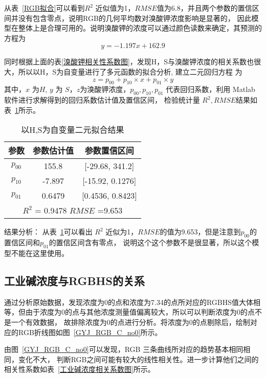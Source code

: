     从表~\ref{RGB拟合}可以看到$R^2$ 近似值为1，$RMSE$值为6.8，并且两个参数的置信区间并没有包含零点，说明RGB的几何平均数对溴酸钾浓度影响是显著的，
    因此模型在整体上是合理可用的。说明溴酸钾的浓度可以通过颜色读数来确定，其预测的方程为
    $$ y = -1.197 x + 162.9 $$

    同时根据上面的表\ref{溴酸钾相关性系数图}，发现H，S与溴酸钾浓度的相关系数也很大，所以以H，S为自变量进行了多元函数的拟合分析,
    建立二元回归方程 为
    $$ z = p_{00} + p_{10} \times x + p_{01} \times y$$
    其中，$x$ 为$H$, $y$ 为 $S$，$z$为溴酸钾浓度，$p_{00},p_{10},p_{01}$ 代表回归系数，利用 Matlab 软件进行求解得到的回归系数估计值及置信区间，
    检验统计量 $R^2, RMSE $结果如表~\ref{二元拟合结果}所示。

    \begin{table}[H]
        \centering
        \caption{以H,S为自变量二元拟合结果}
        \label{二元拟合结果}
        \begin{tabular}{@{}ccc@{}}
        \toprule
        参数         & 参数估计值     & 参数置信区间                  \\ \midrule
        $p_{00}$     & 155.8     & {[}-29.68, 341.2{]}     \\
        $p_{10}$     & -7.897    & {[}-15.92, 0.1276{]}    \\
        $p_{01}$     & 0.6479    & {[}0.4536, 0.8423{]}    \\
        \hline
        \multicolumn{3}{c}{$R^2$ = 0.9478 $RMSE$ =9.653} \\ \bottomrule
        \end{tabular}
        \end{table}

    结果分析： 从表~\ref{二元拟合结果}可以看出 $R^2$ 近似为1，$RMSE$的值为9.653，但是注意到$p_{00}$的置信区间和$p_{01}$的置信区间含有零点，
    说明这个这个参数不是很显著，所以这个模型不能在这里使用。

\subsection{工业碱浓度与RGBHS的关系}
    通过分析原始数据，发现浓度为0的点和浓度为7.34的点所对应的RGBHS值大体相等，但由于浓度为0的点与其他浓度测量值偏离较大，所以可以判断浓度为0的点不是一个有效数据，
    故排除浓度为0的点进行分析。将浓度为0的点剔除后，绘制对应的RGB折线图如图~\ref{GYJ_RGB_C_no0}所示。


    由图~\ref{GYJ_RGB_C_no0}可以发现，RGB 三条曲线所对应的趋势基本相同相同，变化不大，
    判断RGB之间可能有较大的线性相关性。进一步计算他们之间的相关性系数如表~\ref{工业碱浓度相关系数图}所示。

